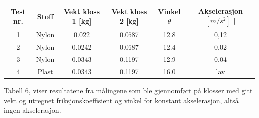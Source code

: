 \documentclass[10pt,a4paper]{report}
\begin{document}
\begin{center}
  \begin{tabular}{| c | c | c | c | c  | c |}
    \hline
    Test nr. & Stoff & Vekt kloss 1 [kg] & Vekt kloss 2 [kg] & Vinkel $\theta$ & Akselerasjon $[m/s^2]$ | \\ \hline
    1 & Nylon & 0.022 & 0.0687 & 12.8 & 0,12 \\ \hline
    2 & Nylon & 0.0242 & 0.0687 & 12.4 & 0,02 \\ \hline
    3 & Nylon & 0.0343 & 0.1197 & 12.9 & 0,04 \\ \hline
    4 & Plast & 0.0343 & 0.1197 & 16.0 & lav  \\ \hline
  \end{tabular}
     \begin{tablenotes}
 	\small
 	\item Tabell 6, viser resultatene fra målingene som ble gjennomført på klosser med gitt vekt og utregnet friksjonskoeffisient og vinkel for konstant akselerasjon, altså ingen akselerasjon.
 	\end{tablenotes}
\end{center}
\end{document}
